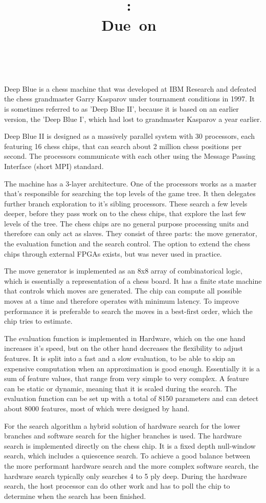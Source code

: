 \documentclass{article}
\title{
\vspace{2in}
\textmd{\textbf{\courseName:\ \pageTitle}}\\
\normalsize\vspace{0.1in}\small{Due\ on\ \hmwkDueDate}\\
\vspace{0.1in}\large{\textit{\hmwkClassInstructor\ \hmwkClassTime}}
\vspace{3in}
}
\author{\textbf{\authorName}}
\date{} %
\begin{document}
  Deep Blue is a chess machine that was developed at IBM Research and defeated the
  chess grandmaster Garry Kasparov under tournament conditions in 1997. It is
  sometimes referred to as 'Deep Blue II', because it is based on an earlier version,
  the 'Deep Blue I', which had lost to grandmaster Kasparov a year earlier.

  Deep Blue II is designed as a massively parallel system with 30 processors, each
  featuring 16 chess chips, that can search about 2 million chess positions per second.
  The processors communicate with each other using the Message Passing Interface
  (short MPI) standard.

  The machine has a 3-layer architecture. One of the processors works as a master
  that's responsible for searching the top levels of the game tree. It then
  delegates further branch exploration to it's sibling processors. These search a
  few levels deeper, before they pass work on to the chess chips, that explore the
  last few levels of the tree. The chess chips are no general purpose processing
  units and therefore can only act as slaves. They consist of three parts: the
  move generator, the evaluation function and the search control. The option to
  extend the chess chips through external FPGAs exists, but was never used in practice.

  The move generator is implemented as an 8x8 array of combinatorical logic, which
  is essentially a representation of a chess board. It has a finite state machine
  that controls which moves are generated. The chip can compute all possible moves
  at a time and therefore operates with minimum latency. To improve performance it
  is preferable to search the moves in a best-first order, which the chip tries to estimate.

  The evaluation function is implemented in Hardware, which on the one hand increases
  it's speed, but on the other hand decreases the flexibility to adjust features.
  It is split into a fast and a slow evaluation, to be able to skip an expensive
  computation when an approximation is good enough. Essentially it is a sum of feature
  values, that range from very simple to very complex. A feature can be static or
  dynamic, meaning that it is scaled during the search. The evaluation function can
  be set up with a total of 8150 parameters and can detect about 8000 features,
  most of which were designed by hand.

  For the search algorithm a hybrid solution of hardware search for the lower branches
  and software search for the higher branches is used. The hardware search is
  implemented directly on the chess chip. It is a fixed depth null-window search,
  which includes a quiescence search. To achieve a good balance between the more
  performant hardware search and the more complex software search, the hardware search
  typically only searches 4 to 5 ply deep.
  During the hardware search, the host processor can do other work and has to poll
  the chip to determine when the search has been finished.
\end{document}
